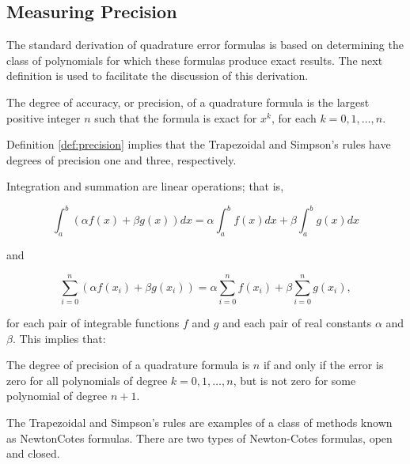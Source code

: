 \subsection*{Measuring Precision}
The standard derivation of quadrature error formulas is based on determining the class of polynomials for which these formulas produce exact results. The next definition is used to facilitate the discussion of this derivation.

\begin{definition}\label{def:precision}
The degree of accuracy, or precision, of a quadrature formula is the largest positive integer $n$ such that the formula is exact for $x^{k}$, for each $k=0,1, \ldots, n$.
\end{definition}
%

Definition \ref{def:precision} implies that the Trapezoidal and Simpson's rules have degrees of precision one and three, respectively.

Integration and summation are linear operations; that is,

$$
\int_{a}^{b}(\alpha f(x)+\beta g(x)) d x=\alpha \int_{a}^{b} f(x) d x+\beta \int_{a}^{b} g(x) d x
$$

and

$$
\sum_{i=0}^{n}\left(\alpha f\left(x_{i}\right)+\beta g\left(x_{i}\right)\right)=\alpha \sum_{i=0}^{n} f\left(x_{i}\right)+\beta \sum_{i=0}^{n} g\left(x_{i}\right),
$$

for each pair of integrable functions $f$ and $g$ and each pair of real constants $\alpha$ and $\beta$. This implies that:

\begin{boxB}
The degree of precision of a quadrature formula is $n$ if and only if the error is zero for all polynomials of degree $k=0,1, \ldots, n$, but is not zero for some polynomial of degree $n+1$.
\end{boxB}

The Trapezoidal and Simpson's rules are examples of a class of methods known as NewtonCotes formulas. There are two types of Newton-Cotes formulas, open and closed.

